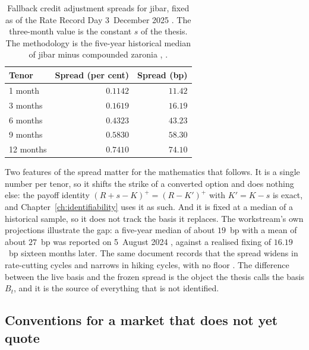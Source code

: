\documentclass[../../../main.tex]{subfiles}
\begin{document}
\begin{table}[htbp]\centering\small
\caption{Fallback credit adjustment spreads for \gls{jibar}, fixed as of the Rate Record Day 3~December 2025 \citep[p.~1 and Table]{bisl2025}. The three-month value is the constant $s$ of the thesis. The methodology is the five-year historical median of \gls{jibar} minus compounded \gls{zaronia} \citep[Sects.~2--4]{isda2025}, \citep[\S1, p.~3]{sarb2025fallback}.}\label{tab:intro-spreads}
\begin{tabular}{@{}lrr@{}}
\toprule
Tenor & Spread (per cent) & Spread (bp) \\
\midrule
1 month & $0.1142$ & $11.42$ \\
3 months & $0.1619$ & $16.19$ \\
6 months & $0.4323$ & $43.23$ \\
9 months & $0.5830$ & $58.30$ \\
12 months & $0.7410$ & $74.10$ \\
\bottomrule
\end{tabular}
\end{table}

Two features of the spread matter for the mathematics that follows. It is a single number per tenor, so it shifts the strike of a converted option and does nothing else: the payoff identity $(R+s-K)^+=(R-K')^+$ with $K'=K-s$ is exact, and Chapter~\ref{ch:identifiability} uses it as such. And it is fixed at a median of a historical sample, so it does not track the basis it replaces. The workstream's own projections illustrate the gap: a five-year median of about $19$~bp with a mean of about $27$~bp was reported on 5~August 2024 \citep[Table~1, p.~10]{sarb2025fallback}, against a realised fixing of $16.19$~bp sixteen months later. The same document records that the spread widens in rate-cutting cycles and narrows in hiking cycles, with no floor \citep[\S5.3.3, p.~12]{sarb2025fallback}. The difference between the live basis and the frozen spread is the object the thesis calls the basis $B_t$, and it is the source of everything that is not identified.

\subsection{Conventions for a market that does not yet quote}
\end{document}
